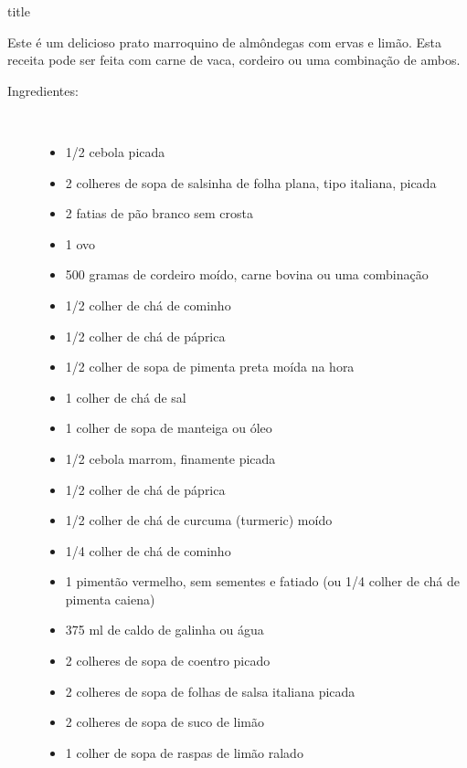 \documentclass [11pt, papel de carta] {article}
\begin{document}
 {title}

Este é um delicioso prato marroquino de almôndegas com ervas e limão. Esta receita pode ser feita com carne de vaca, cordeiro ou uma combinação de ambos.

\begin {description}

\item [Ingredientes:] \ \\
\begin {itemize}
\item 1/2 cebola picada
\item 2 colheres de sopa de salsinha de folha plana, tipo italiana, picada
\item 2 fatias de pão branco sem crosta
\item 1 ovo
\item 500 gramas de cordeiro moído, carne bovina ou uma combinação
\item 1/2 colher de chá de cominho
\item 1/2 colher de chá de páprica
\item 1/2 colher de sopa de pimenta preta moída na hora
\item 1 colher de chá de sal
\item 1 colher de sopa de manteiga ou óleo
\item 1/2 cebola marrom, finamente picada
\item 1/2 colher de chá de páprica
\item 1/2 colher de chá de curcuma (turmeric) moído
\item 1/4 colher de chá de cominho
\item 1 pimentão vermelho, sem sementes e fatiado (ou 1/4 colher de chá de pimenta caiena)
\item 375 ml de caldo de galinha ou água
\item 2 colheres de sopa de coentro picado
\item 2 colheres de sopa de folhas de salsa italiana picada
\item 2 colheres de sopa de suco de limão
\item 1 colher de sopa de raspas de limão ralado
\end {itemize}


\end{description}
\end{document}
